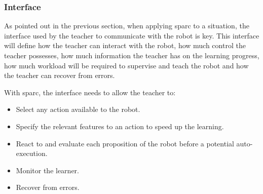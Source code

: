 %
%
\subsubsection{Interface} \label{sec:tuto_interface}

As pointed out in the previous section, when applying \gls{sparc} to a situation, the interface used by the teacher to communicate with the robot is key. This interface will define how the teacher can interact with the robot, how much control the teacher possesses, how much information the teacher has on the learning progress, how much workload will be required to supervise and teach the robot and how the teacher can recover from errors.

With \gls{sparc}, the interface needs to allow the teacher to:
\begin{itemize}
	\item Select any action available to the robot.
	\item Specify the relevant features to an action to speed up the learning.
	\item React to and evaluate each proposition of the robot before a potential auto-execution.
	\item Monitor the learner.
	\item Recover from errors.
\end{itemize}

